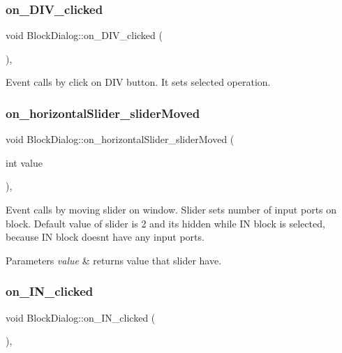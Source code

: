 \subsubsection{\texorpdfstring{on\+\_\+\+D\+I\+V\+\_\+clicked}{on\_DIV\_clicked}}
{\footnotesize\ttfamily void Block\+Dialog\+::on\+\_\+\+D\+I\+V\+\_\+clicked (\begin{DoxyParamCaption}{ }\end{DoxyParamCaption})\hspace{0.3cm}{\ttfamily [private]}, {\ttfamily [slot]}}

Event calls by click on D\+IV button. It sets selected operation. \mbox{\label{classBlockDialog_a9c009de0d86bff7a265f3db598e204fc}} 
\subsubsection{\texorpdfstring{on\+\_\+horizontal\+Slider\+\_\+slider\+Moved}{on\_horizontalSlider\_sliderMoved}}
{\footnotesize\ttfamily void Block\+Dialog\+::on\+\_\+horizontal\+Slider\+\_\+slider\+Moved (\begin{DoxyParamCaption}\item[{int}]{value }\end{DoxyParamCaption})\hspace{0.3cm}{\ttfamily [private]}, {\ttfamily [slot]}}

Event calls by moving slider on window. Slider sets number of input ports on block. Default value of slider is 2 and its hidden while IN block is selected, because IN block doesnt have any input ports.


\begin{DoxyParams}{Parameters}
{\em value} & returns value that slider have. \\
\hline
\end{DoxyParams}
\mbox{\label{classBlockDialog_aaa26399a715ce36bf46f9c4a7a3b834a}} 
\subsubsection{\texorpdfstring{on\+\_\+\+I\+N\+\_\+clicked}{on\_IN\_clicked}}
{\footnotesize\ttfamily void Block\+Dialog\+::on\+\_\+\+I\+N\+\_\+clicked (\begin{DoxyParamCaption}{ }\end{DoxyParamCaption})\hspace{0.3cm}{\ttfamily [private]}, {\ttfamily [slot]}}

